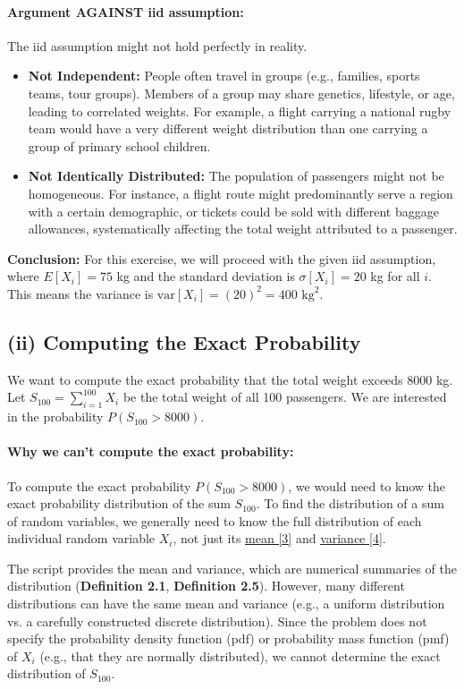 \documentclass[11pt,a4paper]{article}
\begin{document}
\paragraph{Argument AGAINST iid assumption:}
The iid assumption might not hold perfectly in reality.
\begin{itemize}
    \item \textbf{Not Independent:} People often travel in groups (e.g., families, sports teams, tour groups). Members of a group may share genetics, lifestyle, or age, leading to correlated weights. For example, a flight carrying a national rugby team would have a very different weight distribution than one carrying a group of primary school children.
    \item \textbf{Not Identically Distributed:} The population of passengers might not be homogeneous. For instance, a flight route might predominantly serve a region with a certain demographic, or tickets could be sold with different baggage allowances, systematically affecting the total weight attributed to a passenger.
\end{itemize}

\textbf{Conclusion:} For this exercise, we will proceed with the given iid assumption, where $E[X_i] = 75$ kg and the standard deviation is $\sigma[X_i] = 20$ kg for all $i$. This means the variance is $\text{var}[X_i] = (20)^2 = 400 \text{ kg}^2$.

\subsection*{(ii) Computing the Exact Probability}
We want to compute the exact probability that the total weight exceeds 8000 kg. Let $S_{100} = \sum_{i=1}^{100} X_i$ be the total weight of all 100 passengers. We are interested in the probability $P(S_{100} > 8000)$.

\paragraph{Why we can't compute the exact probability:}
To compute the exact probability $P(S_{100} > 8000)$, we would need to know the exact probability distribution of the sum $S_{100}$. To find the distribution of a sum of random variables, we generally need to know the full distribution of each individual random variable $X_i$, not just its \hyperlink{concept:ev}{mean [3]} and \hyperlink{concept:var}{variance [4]}.

The script provides the mean and variance, which are numerical summaries of the distribution (\textbf{Definition 2.1}, \textbf{Definition 2.5}). However, many different distributions can have the same mean and variance (e.g., a uniform distribution vs. a carefully constructed discrete distribution). Since the problem does not specify the probability density function (pdf) or probability mass function (pmf) of $X_i$ (e.g., that they are normally distributed), we cannot determine the exact distribution of $S_{100}$.
\end{document}
